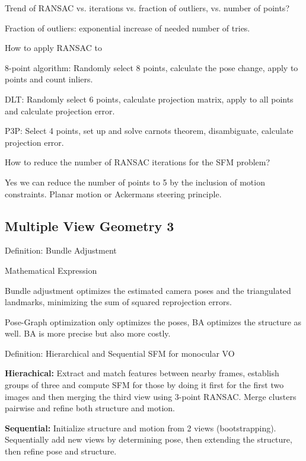 \documentclass[10pt,a4paper]{scrartcl}
\begin{document}
\begin{multicols*}{2}
\begin{QandA}
{Trend of RANSAC vs. iterations vs. fraction of outliers, vs. number of points?}
\item Fraction of outliers: exponential increase of needed number of tries.
\item 
\end{QandA}

\begin{QandA}
{How to apply RANSAC to}
\item 8-point algorithm: Randomly select 8 points, calculate the pose change, apply to points and count inliers.
\item DLT: Randomly select 6 points, calculate projection matrix, apply to all points and calculate projection error.
\item P3P: Select 4 points, set up and solve carnots theorem, disambiguate, calculate projection error. 
\end{QandA}

\begin{QandA}
{How to reduce the number of RANSAC iterations for the SFM problem?}
\item Yes we can reduce the number of points to 5 by the inclusion of motion constraints. Planar motion or Ackermans steering principle.
\end{QandA}

\subsection*{Multiple View Geometry 3}

\begin{QandA}
{Definition: Bundle Adjustment}
\item Mathematical Expression

\item Bundle adjustment optimizes the estimated camera poses and the triangulated landmarks, minimizing the sum of squared reprojection errors.
\item Pose-Graph optimization only optimizes the poses, BA optimizes the structure as well. BA is more precise but also more costly.
\end{QandA}

\begin{QandA}
{Definition: Hierarchical and Sequential SFM for monocular VO}
\item \textbf{Hierachical:} Extract and match features between nearby frames, establish groups of three and compute SFM for those by doing it first for the first two images and then merging the third view using 3-point RANSAC. Merge clusters pairwise and refine both structure and motion.
\item \textbf{Sequential:} Initialize structure and motion from 2 views (bootstrapping). Sequentially add new views by determining pose, then extending the structure, then refine pose and structure.
\end{QandA}


\end{multicols*}
\end{document}
